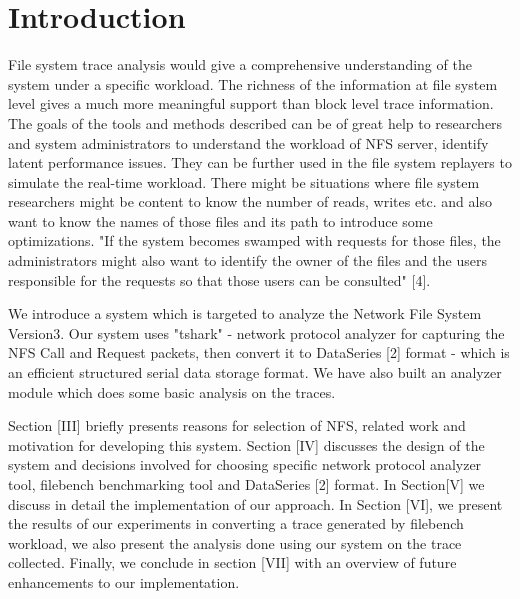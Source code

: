 \documentclass[conference]{IEEEtran}
\begin{document}




%
\IEEEpeerreviewmaketitle



\section{Introduction}
File system trace analysis would give a comprehensive understanding of the system under a specific workload. The richness of the information at file system level gives a much more meaningful support than block level trace information. The goals of the tools and methods described can be of great help to researchers and system administrators to understand the workload of NFS server, identify latent performance issues. They can be further used in the file system replayers to simulate the real-time workload. There might be situations where file system researchers might be content to know the number of reads, writes etc. and also want to know the names of those files and its path to introduce some optimizations. "If the system becomes swamped with requests for those files, the administrators might also want to identify the owner of the files and the users responsible for the requests so that those users can be consulted" [4].

We introduce a system which is targeted to analyze the Network File System Version3. Our system uses "tshark" - network protocol analyzer for capturing the NFS Call and Request packets, then convert it to DataSeries [2] format - which is an efficient structured serial data storage format. We have also built an analyzer module which does some basic analysis on the traces.
  
Section [III] briefly presents reasons for selection of NFS, related work and motivation for developing this system. Section [IV] discusses the design of the system and decisions involved for choosing specific network protocol analyzer tool, filebench benchmarking tool and DataSeries [2] format. In Section[V] we discuss in detail the implementation of our approach. In Section [VI], we present the results of our experiments in converting a trace generated by filebench workload, we also present the analysis done using our system on the trace collected. Finally, we conclude in section [VII] with an overview of future enhancements to our implementation.\\
\end{document}
